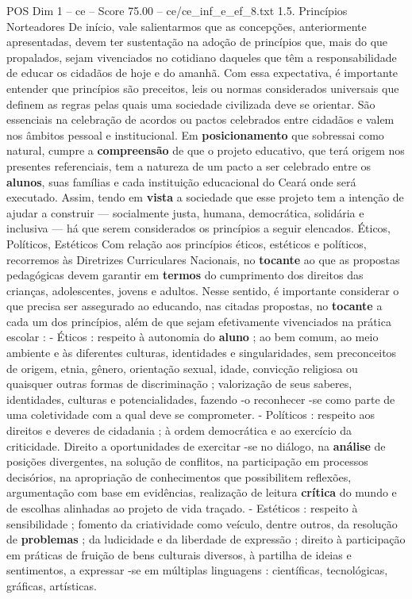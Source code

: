 \begin{textsample}{POS Dim 1 – ce – Score 75.00 – ce/ce\_inf\_e\_ef\_8.txt}  \label{ex:f1_pos_044}
1.5.
Princípios Norteadores De início, vale salientarmos que as concepções, anteriormente apresentadas, devem ter sustentação na adoção de princípios que, mais do que propalados, sejam vivenciados no cotidiano daqueles que têm a responsabilidade de educar os cidadãos de hoje e do amanhã.
Com essa expectativa, é importante entender que princípios são preceitos, leis ou normas considerados universais que definem as regras pelas quais uma sociedade civilizada deve se orientar.
São essenciais na celebração de acordos ou pactos celebrados entre cidadãos e valem nos âmbitos pessoal e institucional.
Em \textbf{posicionamento} que sobressai como natural, cumpre a \textbf{compreensão} de que o projeto educativo, que terá origem nos presentes referenciais, tem a natureza de um pacto a ser celebrado entre os \textbf{alunos}, suas famílias e cada instituição educacional do Ceará onde será executado.
Assim, tendo em \textbf{vista} a sociedade que esse projeto tem a intenção de ajudar a construir — socialmente justa, humana, democrática, solidária e inclusiva — há que serem considerados os princípios a seguir elencados.
Éticos, Políticos, Estéticos Com relação aos princípios éticos, estéticos e políticos, recorremos às Diretrizes Curriculares Nacionais, no \textbf{tocante} ao que as propostas pedagógicas devem garantir em \textbf{termos} do cumprimento dos direitos das crianças, adolescentes, jovens e adultos.
Nesse sentido, é importante considerar o que precisa ser assegurado ao educando, nas citadas propostas, no \textbf{tocante} a cada um dos princípios, além de que sejam efetivamente vivenciados na prática escolar : - Éticos : respeito à autonomia do \textbf{aluno} ; ao bem comum, ao meio ambiente e às diferentes culturas, identidades e singularidades, sem preconceitos de origem, etnia, gênero, orientação sexual, idade, convicção religiosa ou quaisquer outras formas de discriminação ; valorização de seus saberes, identidades, culturas e potencialidades, fazendo -o reconhecer -se como parte de uma coletividade com a qual deve se comprometer. - Políticos : respeito aos direitos e deveres de cidadania ; à ordem democrática e ao exercício da criticidade.
Direito a oportunidades de exercitar -se no diálogo, na \textbf{análise} de posições divergentes, na solução de conflitos, na participação em processos decisórios, na apropriação de conhecimentos que possibilitem reflexões, argumentação com base em evidências, realização de leitura \textbf{crítica} do mundo e de escolhas alinhadas ao projeto de vida traçado. - Estéticos : respeito à sensibilidade ; fomento da criatividade como veículo, dentre outros, da resolução de \textbf{problemas} ; da ludicidade e da liberdade de expressão ; direito à participação em práticas de fruição de bens culturais diversos, à partilha de ideias e sentimentos, a expressar -se em múltiplas linguagens : científicas, tecnológicas, gráficas, artísticas.

\end{textsample}
